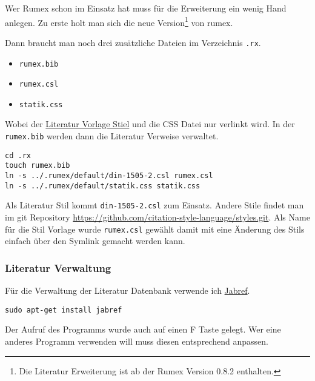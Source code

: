Wer Rumex schon im Einsatz hat muss für die Erweiterung ein wenig Hand
anlegen. Zu erste holt man sich die neue Version\footnote{Die Literatur
  Erweiterung ist ab der Rumex Version 0.8.2 enthalten.} von rumex.

Dann braucht man noch drei zusätzliche Dateien im Verzeichnis
\texttt{.rx}.

\begin{itemize}
\itemsep1pt\parskip0pt
\item
  \texttt{rumex.bib}
\item
  \texttt{rumex.csl}
\item
  \texttt{statik.css}
\end{itemize}

Wobei der \hyperref[literatur-stil]{Literatur Vorlage Stiel} und die CSS
Datei nur verlinkt wird. In der \texttt{rumex.bib} werden dann die
Literatur Verweise verwaltet.

\begin{verbatim}
cd .rx
touch rumex.bib
ln -s ../.rumex/default/din-1505-2.csl rumex.csl
ln -s ../.rumex/default/statik.css statik.css
\end{verbatim}


Als Literatur Stil kommt \texttt{din-1505-2.csl} zum Einsatz. Andere
Stile findet man im git Repository
\url{https://github.com/citation-style-language/styles.git}. Als Name
für die Stil Vorlage wurde \texttt{rumex.csl} gewählt damit mit eine
Änderung des Stils einfach über den Symlink gemacht werden kann.

\subsubsection{Literatur Verwaltung}\label{literatur-verwaltung}

Für die Verwaltung der Literatur Datenbank verwende ich
\href{http://jabref.sourceforge.net/}{Jabref}.

\begin{verbatim}
sudo apt-get install jabref
\end{verbatim}

Der Aufruf des Programms wurde auch auf einen F Taste gelegt. Wer eine
anderes Programm verwenden will muss diesen entsprechend anpassen.

